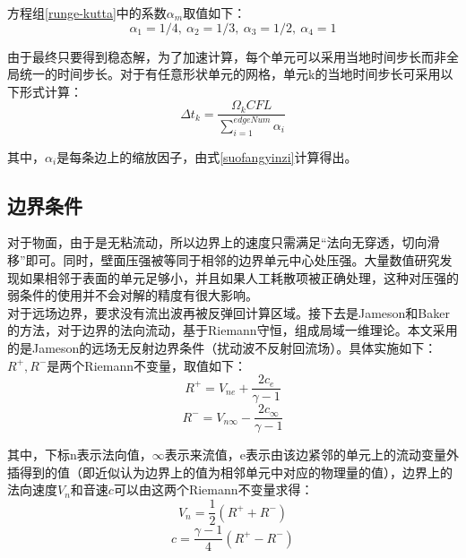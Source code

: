 \documentclass[UTF8]{ctexart}
\begin{document}
\indent 方程组\eqref{runge-kutta}中的系数$\alpha_m$取值如下：
\[	\alpha_1=1/4,\ \alpha_2=1/3,\ \alpha_3=1/2,\ \alpha_4=1 \]

\indent 由于最终只要得到稳态解，为了加速计算，每个单元可以采用当地时间步长而非全局统一的时间步长。对于有任意形状单元的网格，单元k的当地时间步长可采用以下形式计算：
\begin{equation}\label{local_timestep}
\Delta t_k=\frac{\Omega_k CFL}{\sum_{i=1}^{edgeNum}\alpha_i}
\end{equation}

\indent 其中，$\alpha_i$是每条边上的缩放因子，由式\eqref{suofangyinzi}计算得出。

\subsection{边界条件}

对于物面，由于是无粘流动，所以边界上的速度只需满足“法向无穿透，切向滑移”即可。同时，壁面压强被等同于相邻的边界单元中心处压强。大量数值研究发现如果相邻于表面的单元足够小，并且如果人工耗散项被正确处理，这种对压强的弱条件的使用并不会对解的精度有很大影响。\\
\indent 对于远场边界，要求没有流出波再被反弹回计算区域。接下去是Jameson和Baker的方法，对于边界的法向流动，基于Riemann守恒，组成局域一维理论。本文采用的是Jameson的远场无反射边界条件（扰动波不反射回流场）。具体实施如下：\\
\indent $R^+,R^-$是两个Riemann不变量，取值如下：
\begin{equation}\label{r_plus}
R^+=V_{ne}+\frac{2c_e}{\gamma-1}
\end{equation}
\begin{equation}\label{r_minus}
R^-=V_{n\infty}-\frac{2c_\infty}{\gamma-1}
\end{equation}

\indent 其中，下标n表示法向值，$\infty$表示来流值，e表示由该边紧邻的单元上的流动变量外插得到的值（即近似认为边界上的值为相邻单元中对应的物理量的值），边界上的法向速度$V_n$和音速$c$可以由这两个Riemann不变量求得：
\begin{equation}\label{vn}
V_n=\frac{1}{2} (R^+ + R^-)
\end{equation}
\begin{equation}\label{c}
c=\frac{\gamma-1}{4} (R^+ - R^-)
\end{equation}
\end{document}
